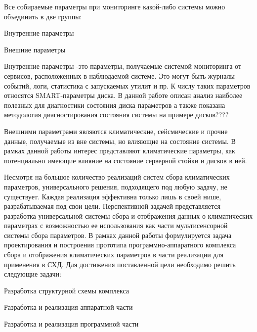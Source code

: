 Все собираемые параметры при мониторинге какой-либо системы можно объединить в две группы: 
\begin{itemize*}
	\item{Внутренние параметры}
	\item{Внешние параметры}
\end{itemize*}	

Внутренние параметры -это параметры, получаемые системой мониторинга от сервисов, расположенных в наблюдаемой системе. Это могут быть журналы событий, логи, статистика с запускаемых утилит и пр. К числу таких параметров относятся SMART-параметры диска. В данной работе описан анализ наиболее полезных для диагностики состояния диска параметров а также показана методология диагностирования состояния системы на примере дисков????

Внешними параметрами являются климатические, сейсмические и прочие данные, получаемые из вне системы, но влияющие на состояние системы. В рамках данной работы интерес представляют климатические параметры, как потенциально имеющие влияние на состояние серверной стойки и дисков в ней. 

Несмотря на большое количество реализаций систем сбора климатических параметров, универсального решения, подходящего под любую задачу, не существует. Каждая реализация эффективна только лишь в своей нише, разрабатываемая под свои цели. Перспективной задачей представляется разработка универсальной системы сбора и отображения данных о климатических параметрах с возможностью ее использования как части мультисенсорной системы сбора параметров.  В рамках данной работы формулируется задача проектирования и построения прототипа программно-аппаратного комплекса сбора и отображения климатических параметров в части реализации для применения в СХД. 
Для достижения поставленной цели необходимо решить следующие задачи:
\begin{itemize*}
	\item{Разработка структурной схемы комплекса}
	\item{Разработка и реализация аппаратной части}
	\item{Разработка и реализация программной части}
\end{itemize*}	

